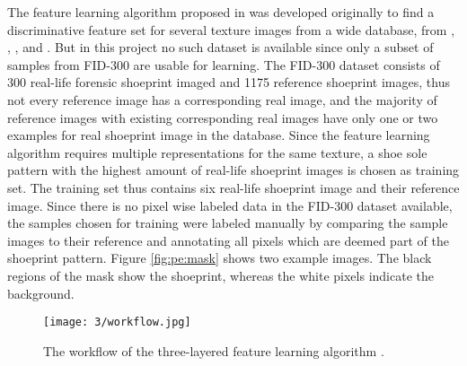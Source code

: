 \documentclass[draft,final]{vutinfth} %
\begin{document}
\par
The feature learning algorithm proposed in \cite{guo2012discriminative} was developed originally to find a discriminative feature set for several texture images from a wide database, from \cite{ojala2002outex}, \cite{dana1999reflectance}, \cite{boland2001neural}, \cite{jantzen2005pap} and \cite{brahnam2007introduction}.
But in this project no such dataset is available since only a subset of samples from FID-300 are usable for learning. 
The FID-300 \cite{kortylewski2014unsupervised} dataset consists of 300 real-life forensic shoeprint imaged and 1175 reference shoeprint images, thus not every reference image has a corresponding real image, and the majority of reference images with existing corresponding real images have only one or two examples for real shoeprint image in the database.
Since the feature learning algorithm requires multiple representations for the same texture, a shoe sole pattern with the highest amount of real-life shoeprint images is chosen as training set.
The training set thus contains six real-life shoeprint image and their reference image. 
Since there is no pixel wise labeled data in the FID-300 dataset available, the samples chosen for training were labeled manually by comparing the sample images to their reference and annotating all pixels which are deemed part of the shoeprint pattern.
Figure \ref{fig:pe:mask} shows two example images. 
The black regions of the mask show the shoeprint, whereas the white pixels indicate the background.

\begin{figure}[h]
  \centering
  \texttt{[image: 3/workflow.jpg]}
  \caption{The workflow of the three-layered feature learning algorithm  \cite{guo2012discriminative}.}
  \label{fig:pe:workflow} %
\end{figure}
\end{document}
